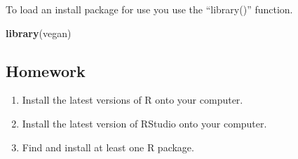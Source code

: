 \documentclass[]{article}
\newenvironment{Shaded}{}{}
\newcommand{\KeywordTok}[1]{\textcolor[rgb]{0.00,0.44,0.13}{\textbf{{#1}}}}
\newcommand{\NormalTok}[1]{{#1}}
\begin{document}
To load an install package for use you use the ``library()'' function.

\begin{Shaded}
\begin{Highlighting}[]
\KeywordTok{library}\NormalTok{(vegan)}
\end{Highlighting}
\end{Shaded}

\subsection{Homework}

\begin{enumerate}
\def\labelenumi{\arabic{enumi}.}
\itemsep1pt\parskip0pt
\item
  Install the latest versions of R onto your computer.
\item
  Install the latest version of RStudio onto your computer.
\item
  Find and install at least one R package.
\end{enumerate}
\end{document}
